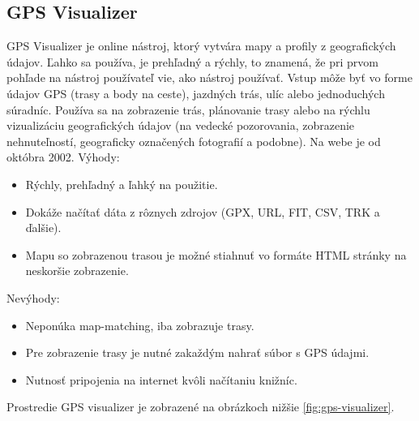 \subsection{GPS Visualizer}
GPS Visualizer je online nástroj, ktorý vytvára mapy a profily z geografických údajov. Ľahko sa používa, je prehľadný a rýchly, to znamená, že pri prvom pohľade na nástroj používateľ vie, ako nástroj používať. Vstup môže byť vo forme údajov GPS (trasy a body na ceste), jazdných trás, ulíc alebo jednoduchých súradníc. Používa sa na zobrazenie trás, plánovanie trasy alebo na rýchlu vizualizáciu geografických údajov (na vedecké pozorovania, zobrazenie nehnuteľností, geograficky označených fotografií a podobne). Na webe je od októbra 2002\cite{gps_visualizer}. Výhody:
\begin{itemize}
  \item Rýchly, prehľadný a ľahký na použitie.
  \item Dokáže načítať dáta z rôznych zdrojov (GPX, URL, FIT, CSV, TRK a ďalšie).
  \item Mapu so zobrazenou trasou je možné stiahnuť vo formáte HTML stránky na neskoršie zobrazenie.
\end{itemize}
Nevýhody:
\begin{itemize}
  \item Neponúka map-matching, iba zobrazuje trasy.
  \item Pre zobrazenie trasy je nutné zakaždým nahrať súbor s GPS údajmi.
  \item Nutnosť pripojenia na internet kvôli načítaniu knižníc.
\end{itemize}
Prostredie GPS visualizer je zobrazené na obrázkoch nižšie \ref{fig:gps-visualizer}.
